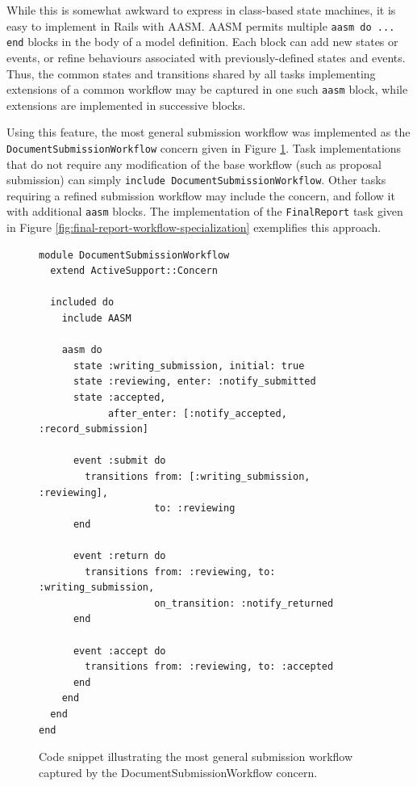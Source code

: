\documentclass[document.tex]{subfiles}
\begin{document}
While this is somewhat awkward to express in class-based state machines, it is easy to implement in Rails with AASM. AASM permits multiple \verb!aasm do ... end!
blocks in the body of a model definition. Each block can add new states or events, or refine behaviours associated with previously-defined states and events. Thus, the common states and transitions shared by all tasks implementing extensions of a common workflow may be captured in one such
\verb!aasm! block, while extensions are implemented in successive blocks.

Using this feature, the most general submission workflow was implemented as the \verb!DocumentSubmissionWorkflow! concern given in Figure
\ref{fig:document-submission-concern}. Task implementations that do not require any modification of the base workflow (such as proposal submission) can simply \verb!include DocumentSubmissionWorkflow!. Other tasks requiring a refined submission workflow may include the concern, and follow it with additional \verb!aasm! blocks. The implementation of the \verb!FinalReport! task given in Figure \ref{fig:final-report-workflow-specialization} exemplifies this approach.

\begin{figure}[!ht]
  \begin{lstlisting}
module DocumentSubmissionWorkflow
  extend ActiveSupport::Concern

  included do
    include AASM

    aasm do
      state :writing_submission, initial: true
      state :reviewing, enter: :notify_submitted
      state :accepted,
            after_enter: [:notify_accepted, :record_submission]

      event :submit do
        transitions from: [:writing_submission, :reviewing],
                    to: :reviewing
      end

      event :return do
        transitions from: :reviewing, to: :writing_submission,
                    on_transition: :notify_returned
      end

      event :accept do
        transitions from: :reviewing, to: :accepted
      end
    end
  end
end
  \end{lstlisting}
  \caption{Code snippet illustrating the most general submission workflow captured by the DocumentSubmissionWorkflow concern.}
  \label{fig:document-submission-concern}
\end{figure}
\end{document}
